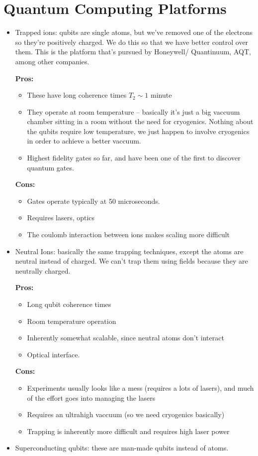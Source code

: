 \section{Quantum Computing Platforms}
\begin{itemize}
	\item Trapped ions: qubits are single atoms, but we've removed one of the electrons so they're positively charged.
		We do this so that we have better control over them. This is the platform that's pursued by Honeywell/
		Quantinuum, AQT, among other companies.  

		\textbf{Pros:}
		\begin{itemize}
			\item These have long coherence times \( T_2 \sim 1 \) minute
			\item They operate at room temperature -- basically it's just a big vaccuum chamber sitting in a room 
				without the need for cryogenics. Nothing about the qubits require low temperature, we just happen 
				to involve cryogenics in order to achieve a better vaccuum. 
			\item Highest fidelity gates so far, and have been one of the first to discover quantum gates.  
		\end{itemize}

		\textbf{Cons:}
		\begin{itemize}
			\item Gates operate typically at 50 microseconds.  
			\item Requires lasers, optics
			\item The coulomb interaction between ions makes scaling more difficult
		\end{itemize}
	\item Neutral Ions: basically the same trapping techniques, except the atoms are neutral instead of 
		charged. We can't trap them using fields because they are neutrally charged. 

		\textbf{Pros:}
		\begin{itemize}
			\item Long qubit coherence times
			\item Room temperature operation 
			\item Inherently somewhat scalable, since neutral atoms don't interact
			\item Optical interface. 
		\end{itemize}
		\textbf{Cons:}
		\begin{itemize}
			\item Experiments usually looks like a mess (requires a lots of lasers), and much of the effort goes into 
				managing the lasers
			\item Requires an ultrahigh vaccuum (so we need cryogenics basically)
			\item Trapping is inherently more difficult and requires high laser power 
		\end{itemize}
	\item Superconducting qubits: these are man-made qubits instead of atoms. 


\end{itemize}

